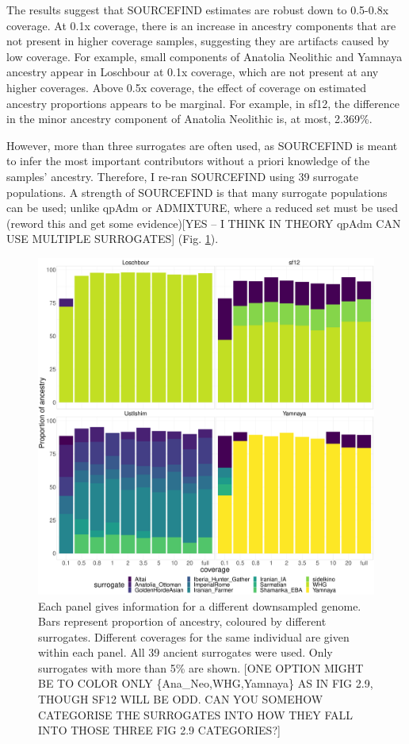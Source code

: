 The results suggest that SOURCEFIND estimates are robust down to 0.5-0.8x coverage. At 0.1x coverage, there is an increase in ancestry components that are not present in higher coverage samples, suggesting they are artifacts caused by low coverage. For example, small components of Anatolia Neolithic and Yamnaya ancestry appear in Loschbour at 0.1x coverage, which are not present at any higher coverages. Above 0.5x coverage, the effect of coverage on estimated ancestry proportions appears to be marginal. For example, in sf12, the difference in the minor ancestry component of Anatolia Neolithic is, at most, 2.369\%.

However, more than three surrogates are often used, as SOURCEFIND is meant to infer the most important contributors without a priori knowledge of the samples' ancestry. Therefore, I re-ran SOURCEFIND using 39 surrogate populations. A strength of SOURCEFIND is that many surrogate populations can be used; unlike qpAdm or ADMIXTURE, {\color{red}where a reduced set must be used (reword this and get some evidence)[YES -- I THINK IN THEORY qpAdm CAN USE MULTIPLE SURROGATES]} (Fig. \ref{fig:SOURCEFIND_AllPSop_downsampled}). 

\begin{figure}[htp]
    \centering
    \includegraphics[width=1.0\textwidth]{../images/chapter1/Allpops_SF_downsampled.pdf}
    \caption{Each panel gives information for a different downsampled genome. Bars represent proportion of ancestry, coloured by different surrogates. Different coverages for the same individual are given within each panel. All 39 ancient surrogates were used. Only surrogates with more than 5\% are shown. {\color{red}[ONE OPTION MIGHT BE TO COLOR ONLY \{Ana\_Neo,WHG,Yamnaya\} AS IN FIG 2.9, THOUGH SF12 WILL BE ODD. CAN YOU SOMEHOW CATEGORISE THE SURROGATES INTO HOW THEY FALL INTO THOSE THREE FIG 2.9 CATEGORIES?]}}
    \label{fig:SOURCEFIND_AllPSop_downsampled}
\end{figure}

